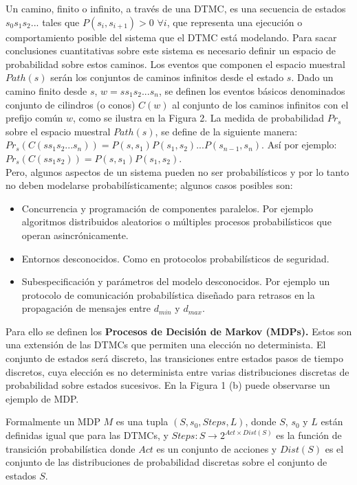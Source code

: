\documentclass[11pt]{article}
\begin{document}
Un camino, finito o infinito, a trav\'es de una DTMC, es una secuencia de estados $s_0s_1s_2...$ tales que $P(s_i, s_{i+1}) > 0$ $\forall i$, que representa una ejecuci\'on o comportamiento posible del sistema que el DTMC est\'a modelando. Para sacar conclusiones cuantitativas sobre este sistema es necesario definir un espacio de probabilidad sobre estos caminos. Los eventos que componen el espacio muestral $Path(s)$ ser\'an los conjuntos de caminos infinitos desde el estado $s$.  Dado un camino finito desde $s$, $w = ss_1s_2...s_n$, se definen los eventos b\'asicos denominados conjunto de cilindros (o conos) $C(w)$ al conjunto de los caminos infinitos con el prefijo com\'un $w$, como se ilustra en la Figura 2. La medida de probabilidad $Pr_s$ sobre el espacio muestral $Path(s)$, se define de la siguiente manera: $Pr_s(C(ss_1s_2...s_n)) = P(s,s_1)P(s_1,s_2)...P(s_{n-1}, s_n)$. As\'i por ejemplo: $Pr_s(C(ss_1s_2)) = P(s,s_1)P(s_1,s_2)$. \\

Pero, algunos aspectos de un sistema pueden no ser probabil\'isticos y por lo tanto no deben modelarse probabil\'isticamente; algunos casos posibles son:

\begin{itemize}
	\item Concurrencia y programaci\'on de componentes paralelos. Por ejemplo algoritmos distribuidos aleatorios o m\'ultiples procesos probabil\'isticos que operan asincr\'onicamente.
	
	\item Entornos desconocidos. Como en protocolos probabil\'isticos de seguridad. %
	
	\item Subespecificaci\'on y par\'ametros del modelo desconocidos. Por ejemplo un protocolo de comunicaci\'on probabil\'istica dise\~nado para retrasos en la propagaci\'on de mensajes entre $d_{min}$ y $d_{max}$.
	
\end{itemize}

Para ello se definen los \textbf{Procesos de Decisi\'on de Markov (MDPs).} Estos son una extensi\'on de las DTMCs que permiten una elecci\'on no determinista. El conjunto de estados ser\'a discreto, las transiciones entre estados pasos de tiempo discretos, cuya elecci\'on es no determinista entre varias distribuciones discretas de probabilidad sobre estados sucesivos. En la Figura 1 (b) puede observarse un ejemplo de MDP.

Formalmente un MDP $M$ es una tupla $(S, s_0, Steps, L)$, donde $S$, $s_0$ y $L$ est\'an definidas igual que para las DTMCs, y $Steps: S \rightarrow 2^{Act \times  Dist(S)}$ es la funci\'on de transici\'on probabil\'istica donde $Act$ es un conjunto de acciones y $Dist(S)$ es el conjunto de las distribuciones de probabilidad discretas sobre el conjunto de estados $S$.
\end{document}
